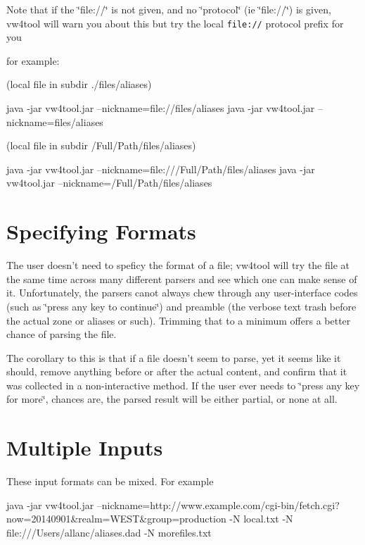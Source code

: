 Note that if the \char`\"{}file\+://\char`\"{} is not given, and no \char`\"{}protocol\char`\"{} (ie \char`\"{}file\+://\char`\"{}) is given, vw4tool will warn you about this but try the local {\tt file\+://} protocol prefix for you

for example\+:

(local file in subdir ./files/aliases) \begin{DoxyVerb}java -jar vw4tool.jar --nickname=file://files/aliases
java -jar vw4tool.jar --nickname=files/aliases
\end{DoxyVerb}


(local file in subdir /\+Full/\+Path/files/aliases) \begin{DoxyVerb}java -jar vw4tool.jar --nickname=file:///Full/Path/files/aliases
java -jar vw4tool.jar --nickname=/Full/Path/files/aliases
\end{DoxyVerb}


\section*{Specifying Formats }

The user doesn't need to speficy the format of a file; vw4tool will try the file at the same time across many different parsers and see which one can make sense of it. Unfortunately, the parsers canot always chew through any user-\/interface codes (such as \char`\"{}press any key to continue\char`\"{}) and preamble (the verbose text trash before the actual zone or aliases or such). Trimming that to a minimum offers a better chance of parsing the file.

The corollary to this is that if a file doesn't seem to parse, yet it seems like it should, remove anything before or after the actual content, and confirm that it was collected in a non-\/interactive method. If the user ever needs to \char`\"{}press any key for more\char`\"{}, chances are, the parsed result will be either partial, or none at all.

\section*{Multiple Inputs }

These input formats can be mixed. For example \begin{DoxyVerb}java -jar vw4tool.jar --nickname=http://www.example.com/cgi-bin/fetch.cgi?now=20140901&realm=WEST&group=production -N local.txt -N file:///Users/allanc/aliases.dad -N morefiles.txt
\end{DoxyVerb}


